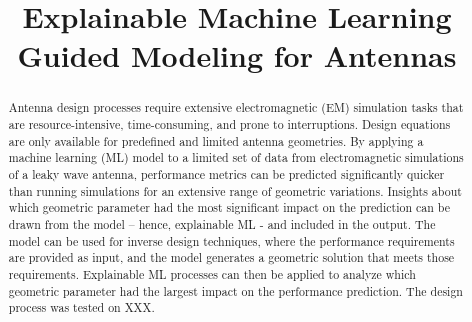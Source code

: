 \documentclass[conference]{IEEEtran}
\begin{document}
\title{Explainable Machine Learning Guided Modeling for Antennas\\
}

\author{
\and
{}
\and
{}
\and
{}
}

\maketitle

\begin{abstract}
Antenna design processes require extensive electromagnetic (EM) simulation tasks that are resource-intensive, time-consuming, and prone to interruptions. Design equations are only available for predefined and limited antenna geometries. By applying a machine learning (ML) model to a limited set of data from electromagnetic simulations of a leaky wave antenna, performance metrics can be predicted significantly quicker than running simulations for an extensive range of geometric variations. Insights about which geometric parameter had the most significant impact on the prediction can be drawn from the model – hence, explainable ML - and included in the output. The model can be used for inverse design techniques, where the performance requirements are provided as input, and the model generates a geometric solution that meets those requirements. Explainable ML processes can then be applied to analyze which geometric parameter had the largest impact on the performance prediction. The design process was tested on XXX.
\end{abstract}
\end{document}
